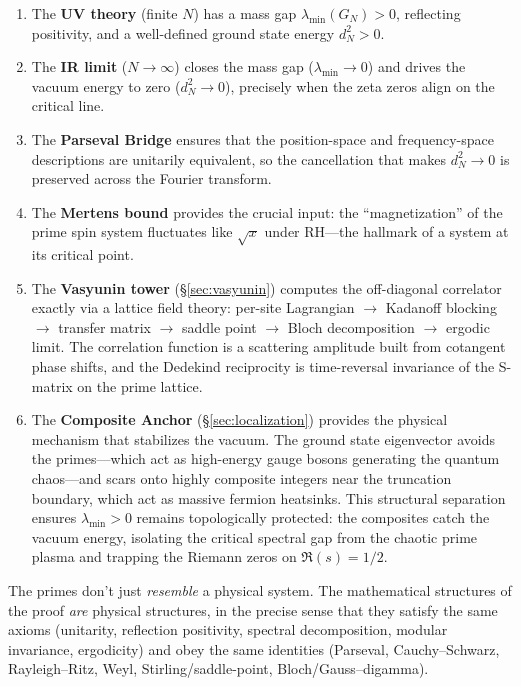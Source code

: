 \documentclass[11pt,a4paper]{article}
\begin{document}
\begin{enumerate}
  \item The \textbf{UV theory} (finite $N$) has a mass gap
    $\lambda_{\min}(G_N) > 0$, reflecting positivity, and a well-defined
    ground state energy $d_N^2 > 0$.

  \item The \textbf{IR limit} ($N \to \infty$) closes the mass gap
    ($\lambda_{\min} \to 0$) and drives the vacuum energy to zero
    ($d_N^2 \to 0$), precisely when the zeta zeros align on the
    critical line.

  \item The \textbf{Parseval Bridge} ensures that the position-space
    and frequency-space descriptions are unitarily equivalent, so the
    cancellation that makes $d_N^2 \to 0$ is preserved across the
    Fourier transform.

  \item The \textbf{Mertens bound} provides the crucial input: the
    ``magnetization'' of the prime spin system fluctuates like
    $\sqrt{x}$ under RH---the hallmark of a system at its critical
    point.

  \item The \textbf{Vasyunin tower} (\S\ref{sec:vasyunin}) computes the
    off-diagonal correlator exactly via a lattice field theory:
    per-site Lagrangian $\to$ Kadanoff blocking $\to$ transfer matrix
    $\to$ saddle point $\to$ Bloch decomposition $\to$ ergodic limit.
    The correlation function is a scattering amplitude built from
    cotangent phase shifts, and the Dedekind reciprocity is time-reversal
    invariance of the S-matrix on the prime lattice.

  \item The \textbf{Composite Anchor} (\S\ref{sec:localization})
    provides the physical mechanism that stabilizes the vacuum.
    The ground state eigenvector avoids the primes---which act as
    high-energy gauge bosons generating the quantum chaos---and
    scars onto highly composite integers near the truncation boundary,
    which act as massive fermion heatsinks.
    This structural separation ensures $\lambda_{\min} > 0$ remains
    topologically protected: the composites catch the vacuum energy,
    isolating the critical spectral gap from the chaotic prime plasma
    and trapping the Riemann zeros on $\Re(s) = 1/2$.
\end{enumerate}

The primes don't just \emph{resemble} a physical system. The
mathematical structures of the proof \emph{are} physical structures,
in the precise sense that they satisfy the same axioms (unitarity,
reflection positivity, spectral decomposition, modular invariance,
ergodicity)
and obey the same identities (Parseval, Cauchy--Schwarz, Rayleigh--Ritz,
Weyl, Stirling/saddle-point, Bloch/Gauss--digamma).
\end{document}
